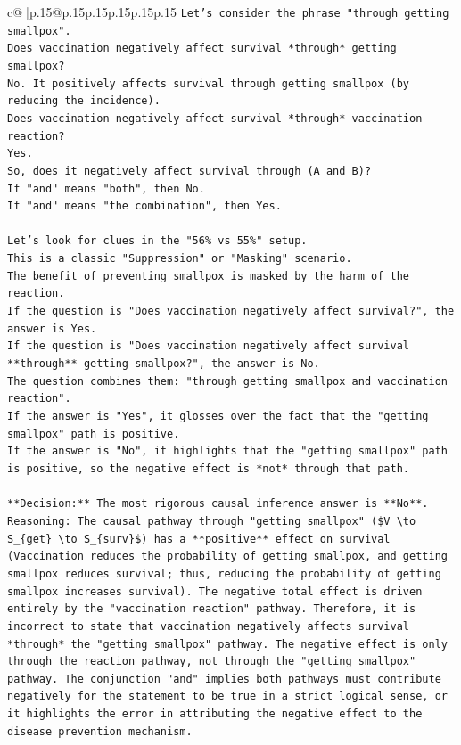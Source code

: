 \documentclass{article}
\begin{document}
{\begin{supertabular}{c@{$\;$}|p{.15\linewidth}@{}p{.15\linewidth}p{.15\linewidth}p{.15\linewidth}p{.15\linewidth}p{.15\linewidth}}
{{{\texttt{Let's consider the phrase "through getting smallpox".} \\
\texttt{Does vaccination negatively affect survival *through* getting smallpox?} \\
\texttt{No. It positively affects survival through getting smallpox (by reducing the incidence).} \\
\texttt{Does vaccination negatively affect survival *through* vaccination reaction?} \\
\texttt{Yes.} \\
\texttt{So, does it negatively affect survival through (A and B)?} \\
\texttt{If "and" means "both", then No.} \\
\texttt{If "and" means "the combination", then Yes.} \\
\\ 
\texttt{Let's look for clues in the "56\% vs 55\%" setup.} \\
\texttt{This is a classic "Suppression" or "Masking" scenario.} \\
\texttt{The benefit of preventing smallpox is masked by the harm of the reaction.} \\
\texttt{If the question is "Does vaccination negatively affect survival?", the answer is Yes.} \\
\texttt{If the question is "Does vaccination negatively affect survival **through** getting smallpox?", the answer is No.} \\
\texttt{The question combines them: "through getting smallpox and vaccination reaction".} \\
\texttt{If the answer is "Yes", it glosses over the fact that the "getting smallpox" path is positive.} \\
\texttt{If the answer is "No", it highlights that the "getting smallpox" path is positive, so the negative effect is *not* through that path.} \\
\\ 
\texttt{**Decision:** The most rigorous causal inference answer is **No**.} \\
\texttt{Reasoning: The causal pathway through "getting smallpox" (\$V \textbackslash{}to S\_\{get\} \textbackslash{}to S\_\{surv\}\$) has a **positive** effect on survival (Vaccination reduces the probability of getting smallpox, and getting smallpox reduces survival; thus, reducing the probability of getting smallpox increases survival). The negative total effect is driven entirely by the "vaccination reaction" pathway. Therefore, it is incorrect to state that vaccination negatively affects survival *through* the "getting smallpox" pathway. The negative effect is only through the reaction pathway, not through the "getting smallpox" pathway. The conjunction "and" implies both pathways must contribute negatively for the statement to be true in a strict logical sense, or it highlights the error in attributing the negative effect to the disease prevention mechanism.} \\
}}}
\end{supertabular}}
\end{document}
